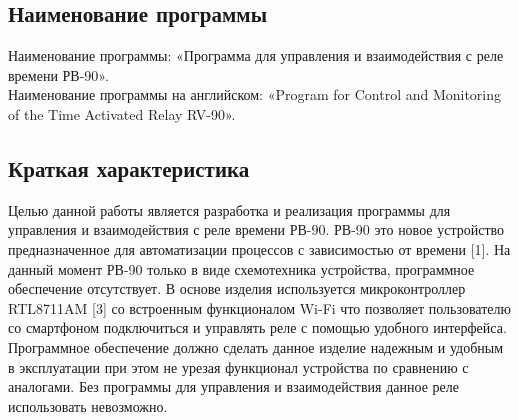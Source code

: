 \subsection{Наименование программы}
Наименование программы: «Программа для управления и взаимодействия с реле времени РВ-90». \\
Наименование программы на английском: «Program for Control and Monitoring of the Time Activated Relay RV-90». \\


\subsection{Краткая характеристика}
Целью данной работы является разработка и реализация программы для управления и взаимодействия с реле времени РВ-90. РВ-90 это новое устройство предназначенное для автоматизации процессов с зависимостью от времени [1]. На данный момент РВ-90 только в виде схемотехника устройства, программное обеспечение отсутствует. В основе изделия используется микроконтроллер RTL8711AM [3] со встроенным функционалом Wi-Fi что позволяет пользователю со смартфоном подключиться и управлять реле с помощью удобного интерфейса. Программное обеспечение должно сделать данное изделие надежным и удобным в эксплуатации при этом не урезая функционал устройства по сравнению с аналогами. Без программы для управления и взаимодействия данное реле использовать невозможно.